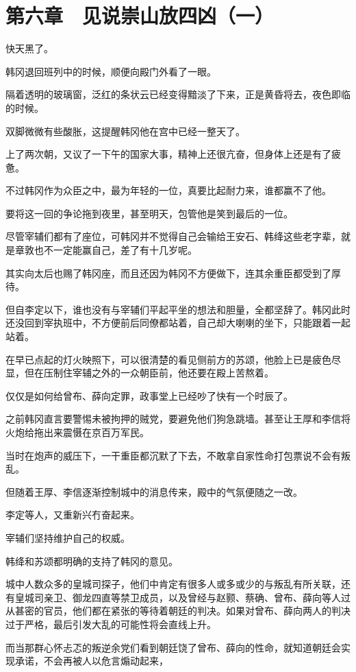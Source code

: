 \section{第六章　见说崇山放四凶（一）}

快天黑了。

韩冈退回班列中的时候，顺便向殿门外看了一眼。

隔着透明的玻璃窗，泛红的条状云已经变得黯淡了下来，正是黄昏将去，夜色即临的时候。

双脚微微有些酸胀，这提醒韩冈他在宫中已经一整天了。

上了两次朝，又议了一下午的国家大事，精神上还很亢奋，但身体上还是有了疲惫。

不过韩冈作为众臣之中，最为年轻的一位，真要比起耐力来，谁都赢不了他。

要将这一回的争论拖到夜里，甚至明天，包管他是笑到最后的一位。

尽管宰辅们都有了座位，可韩冈并不觉得自己会输给王安石、韩绛这些老字辈，就是章敦也不一定能赢自己，差了有十几岁呢。

其实向太后也赐了韩冈座，而且还因为韩冈不方便做下，连其余重臣都受到了厚待。

但自李定以下，谁也没有与宰辅们平起平坐的想法和胆量，全都坚辞了。韩冈此时还没回到宰执班中，不方便前后同僚都站着，自己却大喇喇的坐下，只能跟着一起站着。

在早已点起的灯火映照下，可以很清楚的看见侧前方的苏颂，他脸上已是疲色尽显，但在压制住宰辅之外的一众朝臣前，他还要在殿上苦熬着。

仅仅是如何给曾布、薛向定罪，政事堂上已经吵了快有一个时辰了。

之前韩冈直言要警惕未被拘押的贼党，要避免他们狗急跳墙。甚至让王厚和李信将火炮给拖出来震慑在京百万军民。

当时在炮声的威压下，一干重臣都沉默了下去，不敢拿自家性命打包票说不会有叛乱。

但随着王厚、李信逐渐控制城中的消息传来，殿中的气氛便随之一改。

李定等人，又重新兴冇奋起来。

宰辅们坚持维护自己的权威。

韩绛和苏颂都明确的支持了韩冈的意见。

城中人数众多的皇城司探子，他们中肯定有很多人或多或少的与叛乱有所关联，还有皇城司亲卫、御龙四直等禁卫成员，以及曾经与赵颢、蔡确、曾布、薛向等人过从甚密的官员，他们都在紧张的等待着朝廷的判决。如果对曾布、薛向两人的判决过于严格，最后引发大乱的可能性将会直线上升。

而当那群心怀忐忑的叛逆余党们看到朝廷饶了曾布、薛向的性命，就知道朝廷会实现承诺，不会再被人以危言煽动起来，

